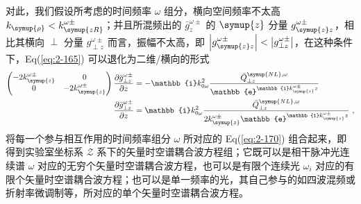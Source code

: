 对此，我们假设所考虑的时间频率 $\omega$ 组分，横向空间频率不太高 $k_{\symup{\rho}} < k^{\omega\pm}_{\symup{zR}}$；并且所混频出的 $\bar{g}^{\omega\pm}_z$ 的 $\symup{z}$ 分量 $g^{\omega\pm}_{\symup{z} z}$，相比其横向 $\perp$ 分量 $g^{\omega\pm}_{\perp z}$ 而言，振幅不太高，即 $\left| g^{\omega\pm}_{\symup{z} z} \right| < \left| g^{\omega\pm}_{\perp z} \right|$，在这种条件下，Eq(\ref{eq:2-165}) 可以退化为二维/横向的形式
\begin{subequations} \label{eq:2-170}
	\abovedisplayskip=10pt
	\belowdisplayskip=10pt
	\begin{align}
		\begin{pmatrix} - 2 k^{\omega\pm}_{\symup{z}} & 0 \\ 0 & - 2 k^{\omega\pm}_{\symup{z}} \end{pmatrix} \displaystyle{\frac{\partial \bar{g}^{\omega\pm}_{\perp z}}{\partial z}} &= - \mathbb{i} k^{2}_{0\omega} \frac{\bar{Q}^{{\symup{NL}},\omega}_{\perp z}}{\mathbb{e}^{\mathbb{i} k^{\omega\pm}_{\symup{z}} z}} \label{eq:2-170a} \\ \displaystyle{\frac{\partial \bar{g}^{\omega\pm}_{\perp z}}{\partial z}} &= \mathbb{i} k^{2}_{0\omega} \frac{\bar{Q}^{{\symup{NL}},\omega}_{\perp z}}{2 k^{\omega\pm}_{\symup{z}} \mathbb{e}^{\mathbb{i} k^{\omega\pm}_{\symup{z}} z}} \label{eq:2-170b}~,
	\end{align}
\end{subequations}
将每一个参与相互作用的时间频率组分 $\omega$ 所对应的 Eq(\ref{eq:2-170}) 组合起来，即得到实验室坐标系 $\mathcal{Z}$ 系下的矢量时空谱耦合波方程组；它既可以是相干脉冲光连续谱 ${\omega}$ 对应的无穷个矢量时空谱耦合波方程，也可以是有限个连续光 ${\omega_i}$ 对应的有限个矢量时空谱耦合波方程；也可以是单一频率的光，其自己参与的如四波混频或折射率微调制等，所对应的单个矢量时空谱耦合波方程。

